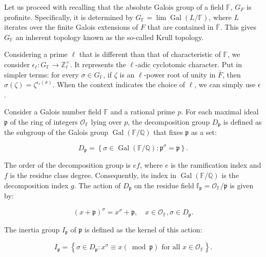 \vspace{1cm}
    
Let us proceed with recalling that the absolute Galois group of a field $\mathbb{F}$, $G_{F}$ is profinite. Specifically, it is determined by $G_\mathbb{F}=\lim \operatorname{Gal}(L / \mathbb{F})$, where $L$ iterates over the finite Galois extensions of $F$ that are contained in $\overline{\mathbb{F}}$. This gives $G_{\mathbb{F}}$ an inherent topology known as the so-called Krull topology.

Considering a prime $\ell$ that is different than that of characteristic of $\mathbb{F}$, we consider  $\epsilon_{\ell}: G_{\mathbb{F}} \rightarrow \mathbb{Z}_{\ell}^{\times}$. It represents the $\ell$-adic cyclotomic character. Put in simpler terms: for every $\sigma \in G_{\mathbb{F}}$, if $\zeta$ is an $\ell$-power root of unity in $\bar{F}$, then $\sigma(\zeta)=\zeta^{\epsilon_{\ell}(\sigma)}$. When the context indicates the choice of $\ell$, we can simply use $\epsilon$.\\


\begin{definition}
    Consider a Galois number field $\mathbb{F}$ and a rational prime $p$. For each maximal ideal $\mathfrak{p}$ of the ring of integers $\mathcal{O}_{\mathbb{F}}$ lying over $p$, the decomposition group $D_{\mathfrak{p}}$ is defined as the subgroup of the Galois group $\operatorname{Gal}(\mathbb{F} / \mathbb{Q})$ that fixes $\mathfrak{p}$ as a set:

$$
D_{\mathfrak{p}}=\left\{\sigma \in \operatorname{Gal}(\mathbb{F} / \mathbb{Q}): \mathfrak{p}^{\sigma}=\mathfrak{p}\right\}.
$$

\end{definition}

The order of the decomposition group is $e f$, where $e$ is the ramification index and $f$ is the residue class degree. Consequently, its index in $\operatorname{Gal}(\mathbb{F} / \mathbb{Q})$ is the decomposition index $g$. The action of $D_{\mathfrak{p}}$ on the residue field $\mathbb{f}_{\mathfrak{p}}=\mathcal{O}_{\mathbb{F}} / \mathfrak{p}$ is given by:

$$
(x+\mathfrak{p})^{\sigma}=x^{\sigma}+\mathfrak{p}, \quad x \in \mathcal{O}_{\mathbb{F}}, \sigma \in D_{\mathfrak{p}}.
$$
\begin{definition}
   The inertia group $I_{\mathfrak{p}}$ of $\mathfrak{p}$ is defined as the kernel of this action:

$$
I_{\mathfrak{p}}=\left\{\sigma \in D_{\mathfrak{p}}: x^{\sigma} \equiv x (\bmod \mathfrak{p}) \text { for all } x \in \mathcal{O}_{\mathbb{F}}\right\}.
$$
 
\end{definition}

